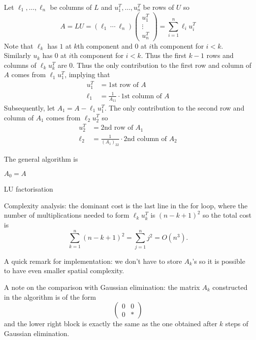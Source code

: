 \documentclass[a4paper]{article}
\begin{document}
Let \(\ell_1, \dots, \ell_n\) be columns of \(L\) and \(u_1^T, \dots, u_n^T\) be rows of \(U\) so
\[
  A = LU = (\ell_1 \ \cdots \  \ell_n)
  \begin{pmatrix}
    u_1^T \\
    \vdots \\
    u_n^T
  \end{pmatrix}
  = \sum_{i = 1}^n \ell_i u_i^T
\]
Note that \(\ell_k\) has \(1\) at \(k\)th component and \(0\) at \(i\)th component for \(i < k\). Similarly \(u_k\) has \(0\) at \(i\)th component for \(i < k\). Thus the first \(k - 1\) rows and columns of \(\ell_k u_k^T\) are \(0\). Thus the only contribution to the first row and column of \(A\) comes from \(\ell_1u_1^T\), implying that
\begin{align*}
  u_1^T &= \text{1st row of } A \\
  \ell_1 &= \frac{1}{A_{11}} \cdot \text{1st column of } A
\end{align*}
Subsequently, let \(A_1 = A - \ell_1u_1^T\). The only contribution to the second row and column of \(A_1\) comes from \(\ell_2u_2^T\) so
\begin{align*}
  u_2^T &= \text{2nd row of } A_1 \\
  \ell_2 &= \frac{1}{(A_1)_{22}} \cdot \text{2nd column of } A_2
\end{align*}

The general algorithm is

\begin{algorithm}
  \(A_0 = A\)\;
  \caption{LU factorisation}
\end{algorithm}

Complexity analysis: the dominant cost is the last line in the for loop, where the number of multiplications needed to form \(\ell_ku_k^T\) is \((n - k + 1)^2\) so the total cost is
\[
  \sum_{k = 1}^n (n - k + 1)^2 = \sum_{j = 1}^n j^2 = O(n^3).
\]

A quick remark for implementation: we don't have to store \(A_k\)'s so it is possible to have even smaller spatial complexity.

A note on the comparison with Gaussian elimination: the matrix \(A_k\) constructed in the algorithm is of the form
\[
  \begin{pmatrix}
    0 & 0 \\
    0 & *
  \end{pmatrix}
\]
and the lower right block is exactly the same as the one obtained after \(k\) steps of Gaussian elimination.
\end{document}
